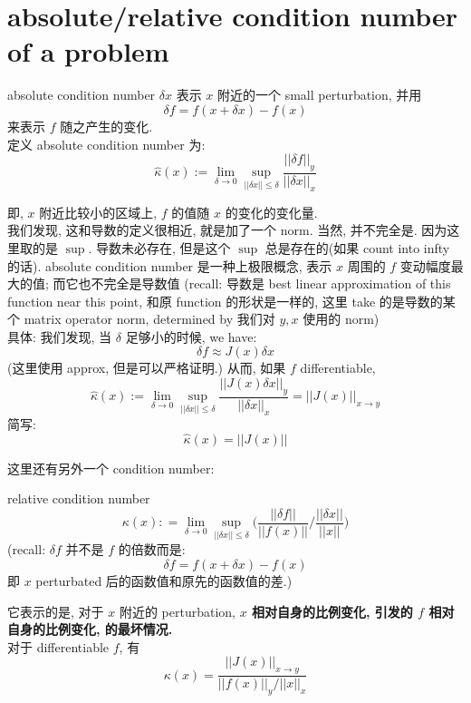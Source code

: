 \documentclass[lang=cn,11pt]{elegantbook}
\begin{document}
\section{absolute/relative condition number of a problem}
\begin{definition}{absolute condition number}
$\delta x$ 表示 $x$ 附近的一个 small perturbation, 并用 \[
\delta f = f(x + \delta x) - f(x)
\]
来表示 $f$ 随之产生的变化. \\
定义 absolute condition number 为: \[
\hat \kappa(x) := \lim_{\delta \to 0} \sup_{||\delta x || \leq \delta} \frac{ ||\delta f ||_y}{||\delta x||_x}
\]
\end{definition}
\begin{remark}
    即, $x$ 附近比较小的区域上, $f$ 的值随 $x$ 的变化的变化量.\\
   我们发现, 这和导数的定义很相近, 就是加了一个 norm. 当然, 并不完全是. 因为这里取的是 $\sup$. 导数未必存在, 但是这个 $\sup$ 总是存在的(如果 count into infty 的话). absolute condition number 是一种上极限概念, 表示 $x$ 周围的 $f$ 变动幅度最大的值; 而它也不完全是导数值 (recall: 导数是 best linear approximation of this function near this point, 和原 function 的形状是一样的, 这里 take 的是导数的某个 matrix operator norm, determined by 我们对 $y,x$ 使用的 norm)\\
具体: 我们发现, 当 $\delta$ 足够小的时候, we have: $$
\delta f \approx J(x) \delta x
$$
(这里使用 approx, 但是可以严格证明.) 从而, 如果 $f$ differentiable,\[
\hat \kappa(x) := \lim_{\delta \to 0} \sup_{||\delta x || \leq \delta} \frac{ ||J(x) \delta x ||_y}{||\delta x||_x} = ||J(x)||_{x\to y}
\]
简写: \[
    \hat\kappa(x) = ||J(x)||
    \]
\end{remark}


这里还有另外一个 condition number:
\begin{definition}{relative condition number}
\[
\kappa (x) : = \lim_{\delta \to 0} \sup_{||\delta x || \leq \delta}   \bigg(  \frac{||\delta f ||}{||f(x)||} \bigg/   \frac{||\delta x||}{||x||} \bigg)
\]
(recall: $\delta f$ 并不是 $f$ 的倍数而是: \[
\delta f = f(x + \delta x) - f(x)
\]
即 $x$ perturbated 后的函数值和原先的函数值的差.)
\end{definition}
\begin{remark}
    它表示的是, 对于 $x$ 附近的 perturbation, \textbf{$x$ 相对自身的比例变化, 引发的 $f$ 相对自身的比例变化, 的最坏情况.}\\
    对于 differentiable $f$, 有 \[
    \kappa (x) = \frac{||J(x)||_{x\to y}}{||f(x)||_y / ||x||_x}
    \]
\end{remark}
\end{document}
